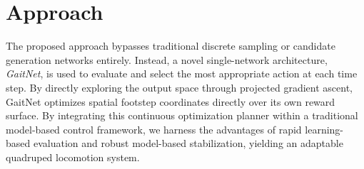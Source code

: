 \section{Approach}
\label{sec:introduction-approach}

The proposed approach bypasses traditional discrete sampling or candidate generation networks entirely. Instead, a novel single-network architecture, \textit{GaitNet}, is used to evaluate and select the most appropriate action at each time step. By directly exploring the output space through projected gradient ascent, GaitNet optimizes spatial footstep coordinates directly over its own reward surface. By integrating this continuous optimization planner within a traditional model-based control framework, we harness the advantages of rapid learning-based evaluation and robust model-based stabilization, yielding an adaptable quadruped locomotion system.
